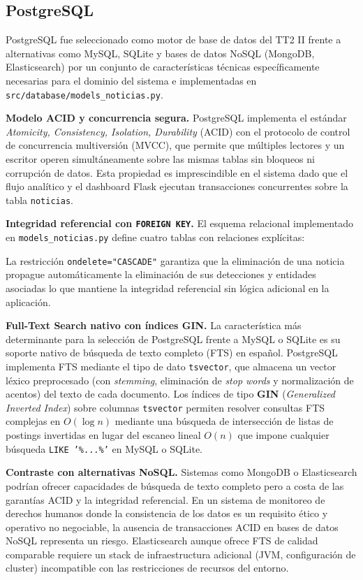 \subsection{PostgreSQL}
\label{subsec:ea_postgresql}

PostgreSQL fue seleccionado como motor de base de datos del TT2 II frente a
alternativas como MySQL, SQLite y bases de datos NoSQL (MongoDB, Elasticsearch)
por un conjunto de características técnicas específicamente necesarias para el
dominio del sistema e implementadas en \texttt{src/database/models\_noticias.py}.

\textbf{Modelo ACID y concurrencia segura.}
PostgreSQL implementa el estándar \textit{Atomicity, Consistency, Isolation,
Durability} (ACID) con el protocolo de control de concurrencia multiversión (MVCC),
que permite que múltiples lectores y un escritor operen simultáneamente sobre las
mismas tablas sin bloqueos ni corrupción de datos. Esta propiedad es imprescindible
en el sistema dado que el flujo analítico y el dashboard Flask ejecutan
transacciones concurrentes sobre la tabla \texttt{noticias}.

\textbf{Integridad referencial con \texttt{FOREIGN KEY}.}
El esquema relacional implementado en \texttt{models\_noticias.py} define cuatro
tablas con relaciones explícitas:

La restricción \texttt{ondelete="CASCADE"} garantiza que la eliminación de una
noticia propague automáticamente la eliminación de sus detecciones y entidades
asociadas lo que mantiene la integridad referencial sin lógica adicional en la
aplicación.

\textbf{Full-Text Search nativo con índices GIN.}
La característica más determinante para la selección de PostgreSQL frente a
MySQL o SQLite es su soporte nativo de búsqueda de texto completo (FTS) en
español. PostgreSQL implementa FTS mediante el tipo de dato \texttt{tsvector},
que almacena un vector léxico preprocesado (con \textit{stemming}, eliminación de
\textit{stop words} y normalización de acentos) del texto de cada documento.
Los índices de tipo \textbf{GIN} (\textit{Generalized Inverted Index}) sobre columnas
\texttt{tsvector} permiten resolver consultas FTS complejas en $O(\log n)$ mediante
una búsqueda de intersección de listas de postings invertidas en lugar del escaneo
lineal $O(n)$ que impone cualquier búsqueda \texttt{LIKE '\%...\%'} en MySQL o SQLite.

\textbf{Contraste con alternativas NoSQL.}
Sistemas como MongoDB o Elasticsearch podrían ofrecer capacidades de búsqueda
de texto completo pero a costa de las garantías ACID y la integridad referencial.
En un sistema de monitoreo de derechos humanos donde la consistencia de los datos
es un requisito ético y operativo no negociable, la ausencia de transacciones
ACID en bases de datos NoSQL representa un riesgo. Elasticsearch
aunque ofrece FTS de calidad comparable requiere un stack de infraestructura
adicional (JVM, configuración de cluster) incompatible con las restricciones
de recursos del entorno.

